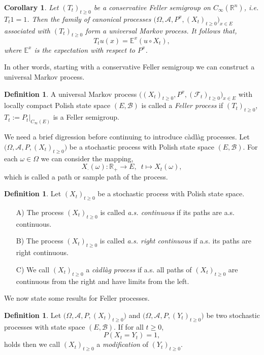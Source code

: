 \documentclass[a4paper, 12pt]{report}
\newtheorem{cor}[theorem]{Corollary}
\theoremstyle{cor}
\theoremstyle{remark}
\theoremstyle{definition}
\newtheorem{defn}[theorem]{Definition}
\begin{document}
\begin{cor}
Let $(T_t)_{t \ge 0}$ be a conservative Feller semigroup on $C_\infty(\mathbb{R}^n)$, i.e. $T_t1 = 1$.  Then the family of canonical processes $\big(\Omega, \mathcal{A}, P^x, (X_t)_{t \ge 0}\big)_{x \in E}$ associated with $(T_t)_{t \ge 0}$ form a universal Markov process.  It follows that,
$$
T_tu(x) = \mathbb{E}^x(u\circ X_t),
$$
where $\mathbb{E}^x$ is the expectation with respect to $P^x$.
\end{cor}
In other words, starting with a conservative Feller semigroup we can construct a universal Markov process.

\begin{defn}
A universal Markov process $\big((X_t)_{t \ge 0}, P^x, (\mathcal{F}_t)_{t \ge 0}\big)_{x \in E}$ with locally compact Polish state space $(E, \mathcal{B})$ is called a \emph{Feller process} if $(T_t)_{t \ge 0}$, $T_t := P_t|_{C_\infty(E)}$ is a Feller semigroup.
\end{defn}

We need a brief digression before continuing to introduce c\`adl\`ag processes.  Let $\big(\Omega, \mathcal{A}, P, (X_t)_{t \ge 0}\big)$ be a stochastic process with Polish state space $(E, \mathcal{B})$.  For each $\omega \in \Omega$ we can consider the mapping,
$$
X_\cdot(\omega) : \mathbb{R}_+ \to E, \,\,\, t \mapsto X_t(\omega),
$$
which is called a path or sample path of the process.

\begin{defn}
Let $(X_t)_{t \ge 0}$ be a stochastic process with Polish state space.
\begin{itemize}
\item[A)] The process $(X_t)_{t \ge 0}$ is called \emph{a.s. continuous} if its paths are a.s. continuous.

\item[B)] The process $(X_t)_{t \ge 0}$ is called \emph{a.s. right continuous} if a.s. its paths are right continuous.

\item[C)] We call $(X_t)_{t \ge 0}$ a \emph{c\`adl\`ag process} if a.s. all paths of $(X_t)_{t \ge 0}$ are continuous from the right and have limits from the left.
\end{itemize}
\end{defn}
We now state some results for Feller processes.

\begin{defn}
Let $\big(\Omega, \mathcal{A}, P, (X_t)_{t \ge 0}\big)$ and $\big(\Omega, \mathcal{A}, P, (Y_t)_{t \ge 0}\big)$ be two stochastic processes with state space $(E, \mathcal{B})$.  If for all $t \ge 0$,
$$
P(X_t = Y_t) = 1,
$$
holds then we call $(X_t)_{t \ge 0}$ a \emph{modification} of $(Y_t)_{t \ge 0}$.
\end{defn}
\end{document}
